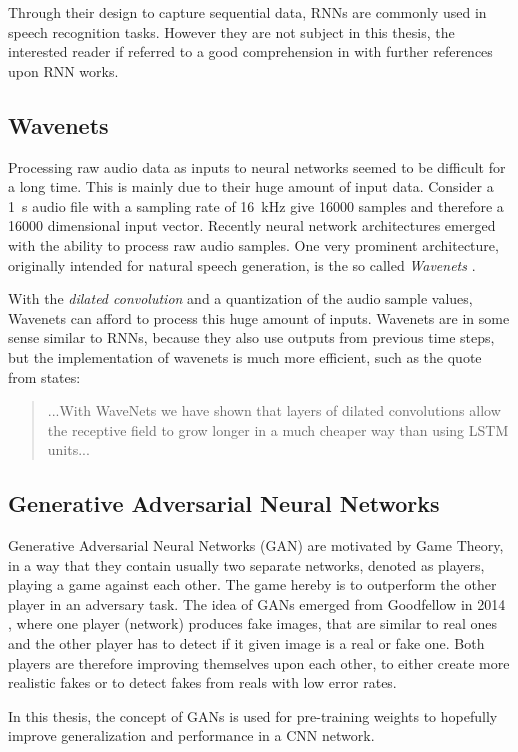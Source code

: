 Through their design to capture sequential data, RNNs are commonly used in speech recognition tasks.
However they are not subject in this thesis, the interested reader if referred to a good comprehension in \cite{Staudenmeyer2019} with further references upon RNN works.



\subsection{Wavenets}\label{sec:prev_nn_wavenet}
Processing raw audio data as inputs to neural networks seemed to be difficult for a long time.
This is mainly due to their huge amount of input data. 
Consider a \SI{1}{\second} audio file with a sampling rate of \SI{16}{\kilo\hertz} give 16000 samples and therefore a 16000 dimensional input vector.
Recently neural network architectures emerged with the ability to process raw audio samples.
One very prominent architecture, originally intended for natural speech generation, is the so called \emph{Wavenets} \cite{Oord2016}.

With the \emph{dilated convolution} and a quantization of the audio sample values, Wavenets can afford to process this huge amount of inputs.
Wavenets are in some sense similar to RNNs, because they also use outputs from previous time steps, but the implementation of wavenets is much more efficient, such as the quote from \cite{Oord2016} states:
\begin{quote}
  ...With WaveNets we have shown that layers of dilated convolutions allow the receptive field to grow longer in a much cheaper way than using LSTM units...
\end{quote}



\subsection{Generative Adversarial Neural Networks}\label{sec:prev_nn_adv}
Generative Adversarial Neural Networks (GAN) are motivated by Game Theory, in a way that they contain usually two separate networks, denoted as players, playing a game against each other.
The game hereby is to outperform the other player in an adversary task.
The idea of GANs emerged from Goodfellow in 2014 \cite{Goodfellow2014}, where one player (network) produces fake images, that are similar to real ones and the other player has to detect if it given image is a real or fake one.
Both players are therefore improving themselves upon each other, to either create more realistic fakes or to detect fakes from reals with low error rates.

In this thesis, the concept of GANs is used for pre-training weights to hopefully improve generalization and performance in a CNN network.